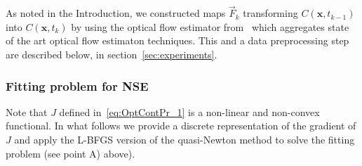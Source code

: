\documentclass[onecolumn, 12pt, conference]{ieeeconf}
\def\F{\vec{F}}
\begin{document}
As noted in the Introduction, we constructed maps $\F_k$ transforming $C(\bm{x},t_{k-1})$ into $C(\bm{x},t_{k})$ by using the optical flow estimator from~\cite{sun13} which aggregates state of the art optical flow estimaton techniques. This and a data preprocessing step are described below, in section~\ref{sec:experiments}.

\subsubsection{Fitting problem for NSE}
\label{sec:NSE}
Note that $J$ defined in~\eqref{eq:OptContPr_1} is a non-linear and non-convex functional. In what follows we provide a discrete representation of the gradient of $J$ and apply the L-BFGS version of the quasi-Newton method to solve the fitting problem (see point A) above).
\end{document}
